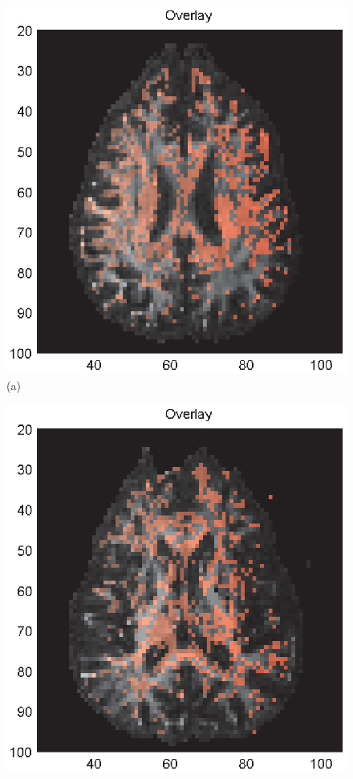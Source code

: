 \documentclass[authoryear,preprint,12pt]{elsarticle}
\begin{document}
\begin{figure}[!htbp]
  \begin{center}
    \begin{minipage}[]{.30\textwidth}
      \centering
      \includegraphics[width=\textwidth]{rejected.eps}
      (a)
      \end{minipage}
\begin{minipage}[]{.30\textwidth}
      \centering
       \includegraphics[width=\textwidth]{overlaynew55b.eps}

\end{minipage}
\end{center}
\end{figure}
\end{document}

